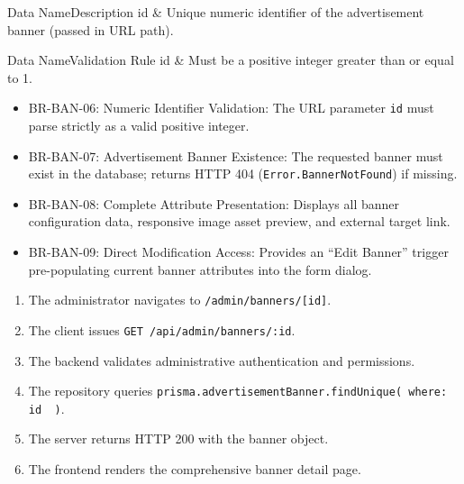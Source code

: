 \begin{specdatatable}{Data Name}{Description}
id & Unique numeric identifier of the advertisement banner (passed in URL path).\\ \hline
\end{specdatatable}

\begin{specdatatable}{Data Name}{Validation Rule}
id & Must be a positive integer greater than or equal to 1.\\ \hline
\end{specdatatable}

\begin{itemize}[leftmargin=1.6em,topsep=3pt,itemsep=2pt,parsep=0pt,label=$\bullet$]\brrulelist
    \item BR-BAN-06: Numeric Identifier Validation: The URL parameter \texttt{id} must parse strictly as a valid positive integer.
    \item BR-BAN-07: Advertisement Banner Existence: The requested banner must exist in the database; returns HTTP 404 (\texttt{Error.BannerNotFound}) if missing.
    \item BR-BAN-08: Complete Attribute Presentation: Displays all banner configuration data, responsive image asset preview, and external target link.
    \item BR-BAN-09: Direct Modification Access: Provides an ``Edit Banner'' trigger pre-populating current banner attributes into the form dialog.
\end{itemize}

\begin{enumerate}[leftmargin=1.6em,topsep=3pt,itemsep=2pt,parsep=0pt]
    \item The administrator navigates to \texttt{/admin/banners/[id]}.
    \item The client issues \texttt{GET /api/admin/banners/:id}.
    \item The backend validates administrative authentication and permissions.
    \item The repository queries \texttt{prisma.advertisementBanner.findUnique({ where: { id } })}.
    \item The server returns HTTP 200 with the banner object.
    \item The frontend renders the comprehensive banner detail page.
\end{enumerate}

